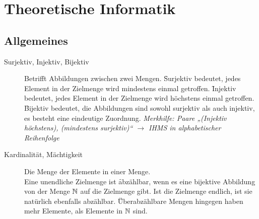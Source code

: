 \section{Theoretische Informatik}

\subsection{Allgemeines}
    \begin{description}
        \item[Surjektiv, Injektiv, Bijektiv] Betrifft Abbildungen zwischen zwei Mengen. \f{Surjektiv} bedeutet, jedes Element in der Zielmenge wird mindestens einmal getroffen. \f{Injektiv} bedeutet, jedes Element in der Zielmenge wird höchstens einmal getroffen. \f{Bijektiv} bedeutet, die Abbildungen sind sowohl surjektiv als auch injektiv, es besteht eine eindeutige Zuordnung. \textit{Merkhilfe: Paare „(Injektiv höchstens), (mindestens surjektiv)“ $\to$ IHMS in alphabetischer Reihenfolge}

        \item[Kardinalität, Mächtigkeit] Die Menge der Elemente in einer Menge. \\
            Eine unendliche Zielmenge ist \f{abzählbar}, wenn es eine bijektive Abbildung von der Menge $\mathbb{N}$ auf die Zielmenge gibt. Ist die Zielmenge endlich, ist sie natürlich ebenfalls abzählbar. \f{Überabzählbare} Mengen hingegen haben mehr Elemente, als Elemente in $\mathbb{N}$ sind.
    \end{description}

